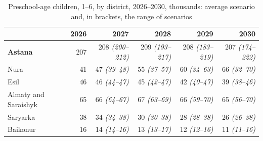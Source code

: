 \begin{table}[ht]
\centering
\caption{Preschool-age children, 1--6, by district, 2026--2030, thousands: average scenario and, in brackets, the range of scenarios}
\label{tab:projection-preschool}
\footnotesize
\setlength{\tabcolsep}{3.5pt}
\begin{tabular}{lrrrrr}
\toprule
& 2026 & 2027 & 2028 & 2029 & 2030 \\
\midrule
\textbf{Astana} & 207 & 208 \textit{\scriptsize(200--212)} & 209 \textit{\scriptsize(193--217)} & 208 \textit{\scriptsize(183--219)} & 207 \textit{\scriptsize(174--222)} \\
\midrule
Nura & 41 & 47 \textit{\scriptsize(39--48)} & 55 \textit{\scriptsize(37--57)} & 60 \textit{\scriptsize(34--63)} & 66 \textit{\scriptsize(32--70)} \\
Esil & 46 & 46 \textit{\scriptsize(44--47)} & 45 \textit{\scriptsize(42--47)} & 42 \textit{\scriptsize(40--47)} & 39 \textit{\scriptsize(38--46)} \\
Almaty and Saraishyk & 65 & 66 \textit{\scriptsize(64--67)} & 67 \textit{\scriptsize(63--69)} & 66 \textit{\scriptsize(59--70)} & 65 \textit{\scriptsize(56--70)} \\
Saryarka & 38 & 34 \textit{\scriptsize(34--38)} & 30 \textit{\scriptsize(30--38)} & 28 \textit{\scriptsize(28--38)} & 26 \textit{\scriptsize(26--38)} \\
Baikonur & 16 & 14 \textit{\scriptsize(14--16)} & 13 \textit{\scriptsize(13--17)} & 12 \textit{\scriptsize(12--16)} & 11 \textit{\scriptsize(11--16)} \\
\bottomrule
\end{tabular}
\end{table}
